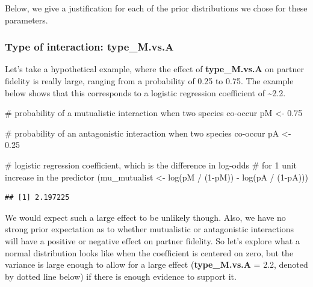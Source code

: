 \documentclass[11pt,]{article}
\newenvironment{Shaded}{}{}
\newcommand{\KeywordTok}[1]{\textcolor[rgb]{0.00,0.00,1.00}{#1}}
\newcommand{\DecValTok}[1]{#1}
\newcommand{\FloatTok}[1]{#1}
\newcommand{\StringTok}[1]{\textcolor[rgb]{0.00,0.50,0.50}{#1}}
\newcommand{\CommentTok}[1]{\textcolor[rgb]{0.00,0.50,0.00}{#1}}
\newcommand{\OperatorTok}[1]{#1}
\newcommand{\NormalTok}[1]{#1}
\begin{document}
Below, we give a justification for each of the prior distributions we
chose for these parameters.

\subsubsection{\texorpdfstring{Type of interaction:
\textbf{type\_M.vs.A}}{Type of interaction: type\_M.vs.A}}\label{type-of-interaction-type_m.vs.a}

Let's take a hypothetical example, where the effect of
\textbf{type\_M.vs.A} on partner fidelity is really large, ranging from
a probability of 0.25 to 0.75. The example below shows that this
corresponds to a logistic regression coefficient of
\textasciitilde{}2.2.

\begin{Shaded}
\begin{Highlighting}[]
\CommentTok{# probability of a mutualistic interaction when two species co-occur}
\NormalTok{pM <-}\StringTok{ }\FloatTok{0.75}  

\CommentTok{# probability of an antagonistic interaction when two species co-occur}
\NormalTok{pA <-}\StringTok{ }\FloatTok{0.25} 

\CommentTok{# logistic regression coefficient, which is the difference in log-odds }
\CommentTok{# for 1 unit increase in the predictor}
\NormalTok{(mu_mutualist <-}\StringTok{ }\KeywordTok{log}\NormalTok{(pM }\OperatorTok{/}\StringTok{ }\NormalTok{(}\DecValTok{1}\OperatorTok{-}\NormalTok{pM)) }\OperatorTok{-}\StringTok{ }\KeywordTok{log}\NormalTok{(pA }\OperatorTok{/}\StringTok{ }\NormalTok{(}\DecValTok{1}\OperatorTok{-}\NormalTok{pA))) }
\end{Highlighting}
\end{Shaded}

\begin{verbatim}
## [1] 2.197225
\end{verbatim}

We would expect such a large effect to be unlikely though. Also, we have
no strong prior expectation as to whether mutualistic or antagonistic
interactions will have a positive or negative effect on partner
fidelity. So let's explore what a normal distribution looks like when
the coefficient is centered on zero, but the variance is large enough to
allow for a large effect (\textbf{type\_M.vs.A} = 2.2, denoted by dotted
line below) if there is enough evidence to support it.
\end{document}

